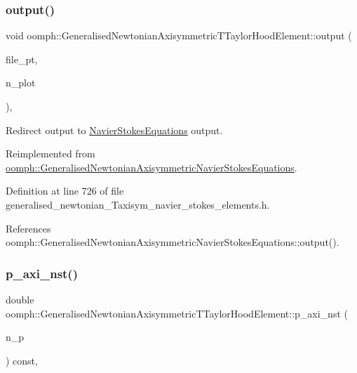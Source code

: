 \subsubsection{\texorpdfstring{output()}{output()}\hspace{0.1cm}{\footnotesize\ttfamily [4/4]}}
{\footnotesize\ttfamily void oomph\+::\+Generalised\+Newtonian\+Axisymmetric\+T\+Taylor\+Hood\+Element\+::output (\begin{DoxyParamCaption}\item[{F\+I\+LE $\ast$}]{file\+\_\+pt,  }\item[{const unsigned \&}]{n\+\_\+plot }\end{DoxyParamCaption})\hspace{0.3cm}{\ttfamily [inline]}, {\ttfamily [virtual]}}



Redirect output to \hyperlink{classoomph_1_1NavierStokesEquations}{Navier\+Stokes\+Equations} output. 



Reimplemented from \hyperlink{classoomph_1_1GeneralisedNewtonianAxisymmetricNavierStokesEquations_a9aae32c881c1c55c2d20c579bf5438f7}{oomph\+::\+Generalised\+Newtonian\+Axisymmetric\+Navier\+Stokes\+Equations}.



Definition at line 726 of file generalised\+\_\+newtonian\+\_\+\+Taxisym\+\_\+navier\+\_\+stokes\+\_\+elements.\+h.



References oomph\+::\+Generalised\+Newtonian\+Axisymmetric\+Navier\+Stokes\+Equations\+::output().

\mbox{\label{classoomph_1_1GeneralisedNewtonianAxisymmetricTTaylorHoodElement_a7567af3eef0ad8287999ba22ccd46892}} 
\subsubsection{\texorpdfstring{p\+\_\+axi\+\_\+nst()}{p\_axi\_nst()}}
{\footnotesize\ttfamily double oomph\+::\+Generalised\+Newtonian\+Axisymmetric\+T\+Taylor\+Hood\+Element\+::p\+\_\+axi\+\_\+nst (\begin{DoxyParamCaption}\item[{const unsigned \&}]{n\+\_\+p }\end{DoxyParamCaption}) const\hspace{0.3cm}{\ttfamily [inline]}, {\ttfamily [virtual]}}



